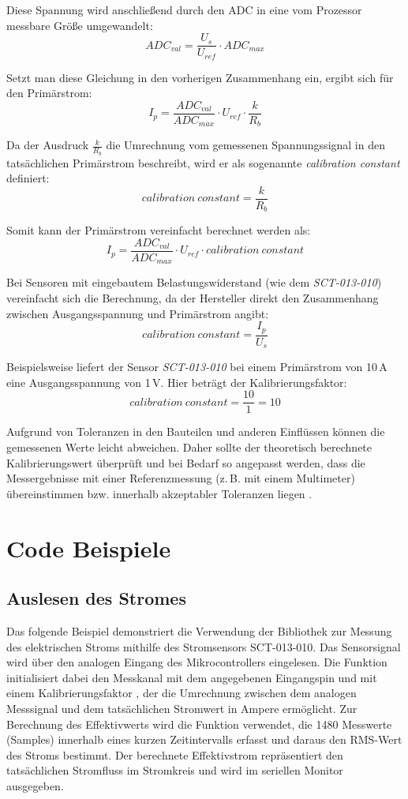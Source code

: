 	Diese Spannung wird anschlie{\ss}end durch den ADC in eine vom Prozessor messbare Grö{\ss}e umgewandelt:
	\[
	ADC_{val} = \frac{U_s}{U_{ref}} \cdot ADC_{max}
	\]
	
	Setzt man diese Gleichung in den vorherigen Zusammenhang ein, ergibt sich für den Primärstrom:
	\[
	I_p = \frac{ADC_{val}}{ADC_{max}} \cdot U_{ref} \cdot \frac{k}{R_b}
	\]
	
	Da der Ausdruck \(\frac{k}{R_b}\) die Umrechnung vom gemessenen Spannungssignal in den tatsächlichen Primärstrom beschreibt, wird er als sogenannte \textit{calibration constant} definiert:
	\[
	calibration\ constant = \frac{k}{R_b}
	\]
	
	Somit kann der Primärstrom vereinfacht berechnet werden als:
	\[
	I_p = \frac{ADC_{val}}{ADC_{max}} \cdot U_{ref} \cdot calibration\ constant
	\]
	
	Bei Sensoren mit eingebautem Belastungswiderstand (wie dem \textit{SCT-013-010}) vereinfacht sich die Berechnung, da der Hersteller direkt den Zusammenhang zwischen Ausgangsspannung und Primärstrom angibt:
	\[
	calibration\ constant = \frac{I_p}{U_s}
	\]
	
	Beispielsweise liefert der Sensor \textit{SCT-013-010} bei einem Primärstrom von 10\,A eine Ausgangsspannung von 1\,V. 
	Hier beträgt der Kalibrierungsfaktor:
	\[
	calibration\ constant = \frac{10}{1} = 10
	\]
	
	Aufgrund von Toleranzen in den Bauteilen und anderen Einflüssen können die gemessenen Werte leicht abweichen. 
	Daher sollte der theoretisch berechnete Kalibrierungswert überprüft und bei Bedarf so angepasst werden, 
	dass die Messergebnisse mit einer Referenzmessung (z.\,B. mit einem Multimeter) übereinstimmen bzw. innerhalb akzeptabler Toleranzen liegen \cite{OpenEnergyMonitor:2023}.
	
	
\section{Code Beispiele}
\subsection{Auslesen des Stromes}
	Das folgende Beispiel demonstriert die Verwendung der Bibliothek  zur Messung des elektrischen Stroms mithilfe des Stromsensors SCT-013-010. Das Sensorsignal wird über den analogen Eingang des Mikrocontrollers eingelesen. Die Funktion  initialisiert dabei den Messkanal mit dem angegebenen Eingangspin  und mit einem Kalibrierungsfaktor , der die Umrechnung zwischen dem analogen Messsignal und dem tatsächlichen Stromwert in Ampere ermöglicht. Zur Berechnung des Effektivwerts wird die Funktion  verwendet, die 1480 Messwerte (Samples) innerhalb eines kurzen Zeitintervalls erfasst und daraus den RMS-Wert des Stroms bestimmt. Der berechnete Effektivstrom repräsentiert den tatsächlichen Stromfluss im Stromkreis und wird im seriellen Monitor ausgegeben.
	
